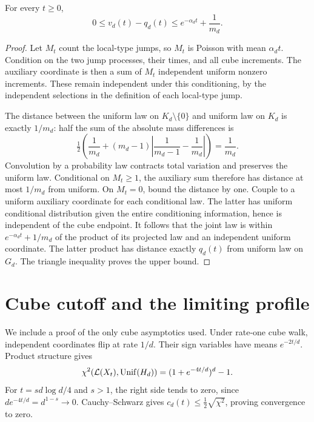 \documentclass[11pt]{article}
\theoremstyle{remark}\newtheorem{remark}[theorem]{Remark}
\begin{document}
\begin{lemma}\label{lem:whole}
For every $t\ge0$,
\begin{equation}\label{eq:whole}
 0\le v_d(t)-q_d(t)\le e^{-\alpha_dt}+\frac1{m_d}.
\end{equation}
\end{lemma}
\begin{proof}
Let $M_t$ count the local-type jumps, so $M_t$ is Poisson with mean $\alpha_dt$. Condition on the two jump processes, their times, and all cube increments. The auxiliary coordinate is then a sum of $M_t$ independent uniform nonzero increments. These remain independent under this conditioning, by the independent selections in the definition of each local-type jump.

The distance between the uniform law on $K_d\setminus\{0\}$ and uniform law on $K_d$ is exactly $1/m_d$: half the sum of the absolute mass differences is
\[
 \tfrac12\left(\frac1{m_d}+(m_d-1)\left|\frac1{m_d-1}-\frac1{m_d}\right|\right)=\frac1{m_d}.
\]
Convolution by a probability law contracts total variation and preserves the uniform law. Conditional on $M_t\ge1$, the auxiliary sum therefore has distance at most $1/m_d$ from uniform. On $M_t=0$, bound the distance by one. Couple to a uniform auxiliary coordinate for each conditional law. The latter has uniform conditional distribution given the entire conditioning information, hence is independent of the cube endpoint. It follows that the joint law is within $e^{-\alpha_dt}+1/m_d$ of the product of its projected law and an independent uniform coordinate. The latter product has distance exactly $q_d(t)$ from uniform law on $G_d$. The triangle inequality proves the upper bound.
\end{proof}

\section{Cube cutoff and the limiting profile}
We include a proof of the only cube asymptotics used. Under rate-one cube walk, independent coordinates flip at rate $1/d$. Their sign variables have means $e^{-2t/d}$. Product structure gives
\begin{equation}\label{eq:chi}
 \chi^2(\mathcal L(X_t),\operatorname{Unif}(H_d))=(1+e^{-4t/d})^d-1.
\end{equation}
For $t=s d\log d/4$ and $s>1$, the right side tends to zero, since $d e^{-4t/d}=d^{1-s}\to0$. Cauchy--Schwarz gives $c_d(t)\le\frac12\sqrt{\chi^2}$, proving convergence to zero.
\end{document}
